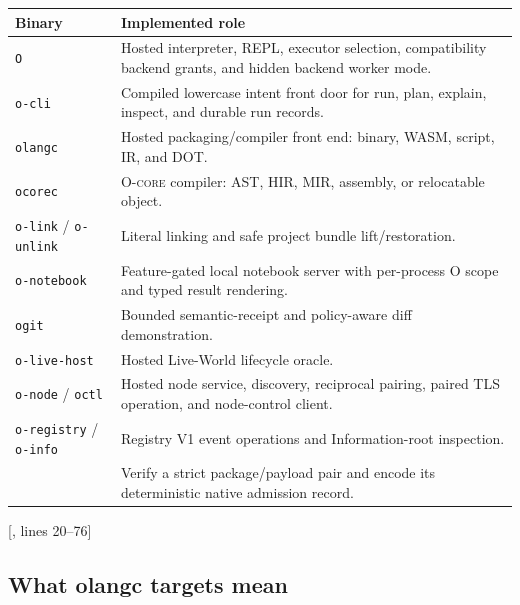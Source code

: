 \documentclass[11pt,oneside]{article}
\newcommand{\ocore}{\textsc{O-core}}
\newcommand{\src}[2]{\textcolor{OSlate}{\scriptsize[\path{#1}, lines #2]}\allowbreak}
\begin{document}
\begin{longtable}{P{0.32\textwidth} P{0.60\textwidth}}
\toprule
\textbf{Binary} & \textbf{Implemented role} \\
\midrule
\endhead
\texttt{O} &
Hosted interpreter, REPL, executor selection, compatibility backend grants,
and hidden backend worker mode. \\
\texttt{o-cli} &
Compiled lowercase intent front door for run, plan, explain, inspect, and
durable run records. \\
\texttt{olangc} &
Hosted packaging/compiler front end: binary, WASM, script, IR, and DOT. \\
\texttt{ocorec} &
\ocore{} compiler: AST, HIR, MIR, assembly, or relocatable object. \\
\texttt{o-link} / \texttt{o-unlink} &
Literal linking and safe project bundle lift/restoration. \\
\texttt{o-notebook} &
Feature-gated local notebook server with per-process O scope and typed result
rendering. \\
\texttt{ogit} &
Bounded semantic-receipt and policy-aware diff demonstration. \\
\texttt{o-live-host} &
Hosted Live-World lifecycle oracle. \\
\texttt{o-node} / \texttt{octl} &
Hosted node service, discovery, reciprocal pairing, paired TLS operation, and
node-control client. \\
\texttt{o-registry} / \texttt{o-info} &
Registry V1 event operations and Information-root inspection. \\
 &
Verify a strict package/payload pair and encode its deterministic native
admission record. \\
\bottomrule
\end{longtable}

\src{Cargo.toml}{20--76}

\subsection{What olangc targets mean}
\end{document}
